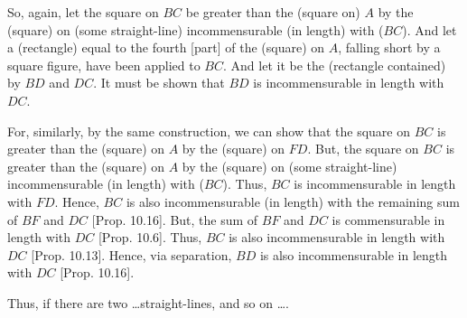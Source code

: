 \begin{Parallel}{}{}
{So, again, let the square on $BC$ be greater than the (square on) $A$ by
the (square) on (some straight-line) incommensurable (in length) with ($BC$). And let a (rectangle) equal to the fourth [part] of the (square) on  $A$, falling short by a
square figure, have been applied to $BC$.  And let it be the (rectangle contained) by $BD$ and $DC$. It must be shown that $BD$ is incommensurable in length with $DC$.

For, similarly, by the same construction, we can show that the square on $BC$ is greater than the (square) on $A$ by the (square) on $FD$. But,
the square on $BC$ is greater than the (square) on $A$ by the (square) on (some straight-line)
incommensurable (in length) with ($BC$). Thus, $BC$ is incommensurable in length with
$FD$. Hence, $BC$ is also incommensurable (in length) with the remaining sum of $BF$ and
$DC$ [Prop. 10.16]. But, the sum of
$BF$ and $DC$ is commensurable in length with $DC$ [Prop. 10.6]. Thus, $BC$ is also incommensurable
in length with $DC$ [Prop. 10.13]. Hence, via
separation, $BD$ is
also incommensurable in length with $DC$ [Prop. 10.16].

Thus,  if there are two \ldots straight-lines, and so on \ldots.}
\end{Parallel}



